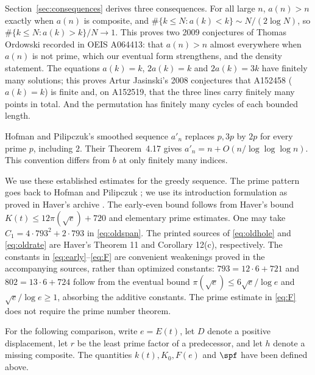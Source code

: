 Section~\ref{sec:consequences} derives three consequences. For all
large $n$, $a(n)>n$ exactly when $a(n)$ is composite, and
$\#\{k\leq N:a(k)<k\}\sim N/(2\log N)$, so
$\#\{k\leq N:a(k)>k\}/N\to1$. This proves two 2009 conjectures of
Thomas Ordowski recorded in OEIS A064413: that $a(n)>n$ almost
everywhere when $a(n)$ is not prime, which our eventual form
strengthens, and the density statement. The equations
$a(k)=k$, $2a(k)=k$ and $2a(k)=3k$ have finitely many solutions; this
proves Artur Jasinski's 2008 conjectures that A152458 ($a(k)=k$) is
finite and, on A152519, that the three lines carry finitely many points
in total. And the permutation has finitely many cycles of each bounded
length.

Hofman and Pilipczuk's smoothed sequence $a'_n$ replaces $p,3p$
by $2p$ for every prime $p$, including $2$. Their Theorem~4.17 \cite{hp} gives $a'_n=n+O(n/\log\log\log n)$.
This convention differs from $b$ at only finitely many indices.


We use these established estimates for the greedy sequence. The prime pattern goes back to
Hofman and Pilipczuk \cite[Theorem~4.3]{hp}; we use its introduction formulation
as proved in Haver's archive \cite[Section~2, (F2)]{haver}.
The early-even bound follows from Haver's bound
$K(t)\leq12\pi(\sqrt e)+720$ \cite[version~3, Theorem~1(a)]{haver}
and elementary prime estimates.
One may take $C_1=4\cdot793^2+2\cdot793$ in \eqref{eq:oldspan}.
The printed sources of \eqref{eq:oldhole} and \eqref{eq:oldrate}
are Haver's Theorem 11 and Corollary 12(c), respectively.
The constants in \eqref{eq:early}--\eqref{eq:F} are convenient
weakenings proved in the accompanying sources, rather than optimized
constants: $793=12\cdot6+721$ and $802=13\cdot6+724$ follow from the
eventual bound $\pi(\sqrt e)\leq6\sqrt e/\log e$ and
$\sqrt e/\log e\geq1$, absorbing the additive constants.
The prime estimate in \eqref{eq:F} does not require the
prime number theorem.

For the following comparison, write $e=E(t)$, let $D$ denote a positive
displacement, let $r$ be the least prime factor of a predecessor, and let
$h$ denote a missing composite. The quantities $k(t),K_0,F(e)$ and
$\spf$ have been defined above.


